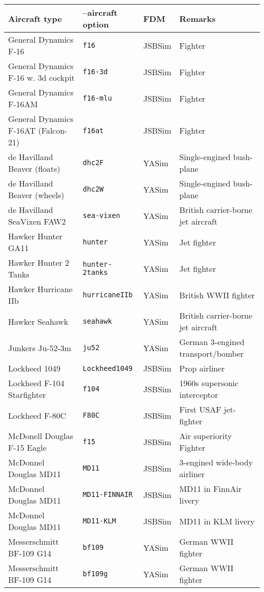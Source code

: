 \noindent
\begin{tabular}{l|l|l|l}
Aircraft type       & --aircraft option & FDM    & Remarks\\\hline
   General Dynamics F-16 & \texttt{f16} & JSBSim & Fighter\\
   General Dynamics F-16 w. 3d cockpit & \texttt{f16-3d} & JSBSim & Fighter\\
   General Dynamics F-16AM & \texttt{f16-mlu} & JSBSim & Fighter\\
   General Dynamics F-16AT (Falcon-21) & \texttt{f16at} & JSBSim & Fighter\\
   de Havilland Beaver (floats) & \texttt{dhc2F} & YASim & Single-engined bush-plane\\
   de Havilland Beaver (wheels) & \texttt{dhc2W} & YASim & Single-engined bush-plane\\
   de Havilland SeaVixen FAW2& \texttt{sea-vixen} & YASim & British carrier-borne jet aircraft\\
   Hawker Hunter GA11 & \texttt{hunter} & YASim & Jet fighter\\
   Hawker Hunter 2 Tanks & \texttt{hunter-2tanks} & YASim & Jet fighter\\
   Hawker Hurricane IIb & \texttt{hurricaneIIb} & YASim & British WWII fighter\\
   Hawker Seahawk & \texttt{seahawk} & YASim & British carrier-borne jet aircraft\\
   Junkers Ju-52-3m & \texttt{ju52} & YASim & German 3-engined transport/bomber\\
   Lockheed 1049    & \texttt{Lockheed1049} & JSBSim  &  Prop airliner\\
   Lockheed F-104 Starfighter & \texttt{f104} & JSBSim & 1960s supersonic interceptor\\
   Lockheed F-80C   & \texttt{F80C}       & JSBSim  &  First USAF jet-fighter\\
   McDonell Douglas F-15 Eagle & \texttt{f15} & JSBSim & Air superiority Fighter\\
   McDonnel Douglas MD11 & \texttt{MD11}  & JSBSim  &  3-engined wide-body airliner\\
   McDonnel Douglas MD11 & \texttt{MD11-FINNAIR}  & JSBSim  & MD11 in FinnAir livery \\
   McDonnel Douglas MD11 & \texttt{MD11-KLM}  & JSBSim  &  MD11 in KLM livery \\
   Messerschmitt BF-109 G14 & \texttt{bf109} & YASim & German WWII fighter\\
   Messerschmitt BF-109 G14 & \texttt{bf109g} & YASim & German WWII fighter\\

\end{tabular}
